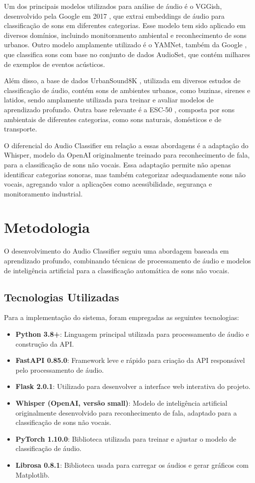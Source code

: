 \documentclass[conference]{IEEEtran}
\begin{document}
Um dos principais modelos utilizados para análise de áudio é o VGGish, desenvolvido pela Google em 2017 \cite{b1}, que extrai embeddings de áudio para classificação de sons em diferentes categorias. Esse modelo tem sido aplicado em diversos domínios, incluindo monitoramento ambiental e reconhecimento de sons urbanos. Outro modelo amplamente utilizado é o YAMNet, também da Google \cite{b2}, que classifica sons com base no conjunto de dados AudioSet, que contém milhares de exemplos de eventos acústicos.

Além disso, a base de dados UrbanSound8K \cite{b5}, utilizada em diversos estudos de classificação de áudio, contém sons de ambientes urbanos, como buzinas, sirenes e latidos, sendo amplamente utilizada para treinar e avaliar modelos de aprendizado profundo. Outra base relevante é a ESC-50 \cite{b6}, composta por sons ambientais de diferentes categorias, como sons naturais, domésticos e de transporte.

O diferencial do Audio Classifier em relação a essas abordagens é a adaptação do Whisper, modelo da OpenAI originalmente treinado para reconhecimento de fala, para a classificação de sons não vocais. Essa adaptação permite não apenas identificar categorias sonoras, mas também categorizar adequadamente sons não vocais, agregando valor a aplicações como acessibilidade, segurança e monitoramento industrial.

\section{Metodologia}
O desenvolvimento do Audio Classifier seguiu uma abordagem baseada em aprendizado profundo, combinando técnicas de processamento de áudio e modelos de inteligência artificial para a classificação automática de sons não vocais.

\subsection{Tecnologias Utilizadas}
Para a implementação do sistema, foram empregadas as seguintes tecnologias:

\begin{itemize}
\item \textbf{Python 3.8+}: Linguagem principal utilizada para processamento de áudio e construção da API.
\item \textbf{FastAPI 0.85.0}: Framework leve e rápido para criação da API responsável pelo processamento de áudio.
\item \textbf{Flask 2.0.1}: Utilizado para desenvolver a interface web interativa do projeto.
\item \textbf{Whisper (OpenAI, versão small)}: Modelo de inteligência artificial originalmente desenvolvido para reconhecimento de fala, adaptado para a classificação de sons não vocais.
\item \textbf{PyTorch 1.10.0}: Biblioteca utilizada para treinar e ajustar o modelo de classificação de áudio.
\item \textbf{Librosa 0.8.1}: Biblioteca usada para carregar os áudios e gerar gráficos com Matplotlib.
\end{itemize}
\end{document}
